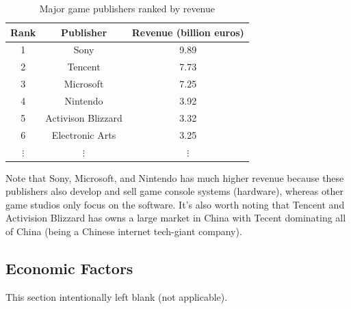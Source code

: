 \documentclass[10pt,letterpaper]{article}
\begin{document}
\begin{table}[H]
	\centering
	\begin{tabular}{ |c|c|c| }
		\hline
		\textbf{Rank} & \textbf{Publisher} & \textbf{Revenue (billion euros)} \\
		\hline
		1             & Sony               & 9.89                             \\
		2             & Tencent            & 7.73                             \\
		3             & Microsoft          & 7.25                             \\
		4             & Nintendo           & 3.92                             \\
		5             & Activison Blizzard & 3.32                             \\
		6             & Electronic Arts    & 3.25                             \\
		$\vdots$      & $\vdots$           & $\vdots$                         \\
	\end{tabular}
	\caption{Major game publishers ranked by revenue\cite{game-publishers-revenue}}
	\label{table:revenue-ranking}
\end{table}

Note that Sony, Microsoft, and Nintendo has much higher revenue because these publishers also develop and sell game console systems (hardware), whereas other game studios only focus on the software. It's also worth noting that Tencent and Activision Blizzard has owns a large market in China with Tecent dominating all of China (being a Chinese internet tech-giant company)\cite{tencent-wiki}.\\

\subsection{Economic Factors}


\begin{center}
	This section intentionally left blank (not applicable).
\end{center}


\end{document}
